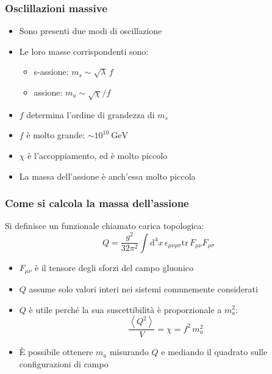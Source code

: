 \begin{frame}
    \frametitle{Osclillazioni massive}
    \begin{itemize}
        \item Sono presenti due modi di oscillazione
        \item Le loro masse corrispondenti sono:
            \begin{itemize}
                \item s-assione: $m_s \sim \sqrt\lambda\,f$
                \item assione: $m_a \sim \sqrt\chi/f$
            \end{itemize}
        \item $f$ determina l'ordine di grandezza di $m_s$
        \item $f$ è molto grande: $\sim 10^{10}\ \text{GeV}$
        \item $\chi$ è l'accoppiamento, ed è molto piccolo
        \item La massa dell'assione è anch'essa molto piccola
    \end{itemize}
\end{frame}

\begin{frame}
    \frametitle{Come si calcola la massa dell'assione}
    Si definisce un funzionale chiamato {\color{fzjblue} carica topologica}:
    $$Q = \frac{g^2}{32\pi^2}\int\mathrm{d}^4x\,%
    \epsilon_{\mu\nu\rho\sigma}\text{tr}\,F_{\mu\nu}F_{\rho\sigma}$$
    \begin{itemize}
        \item $F_{\mu\nu}$ è il tensore degli sforzi del campo gluonico
        \item $Q$ assume solo valori interi nei sistemi comunemente considerati
        \item $Q$ è utile perché la sua suscettibilità è proporzionale a $m_a^2$:
            $$\frac{\left<Q^2\right>}{V}=\chi=f^2\,m_a^2$$
        \item È possibile ottenere $m_a$ misurando $Q$ %
            e mediando il quadrato sulle configurazioni di campo
    \end{itemize}
\end{frame}

